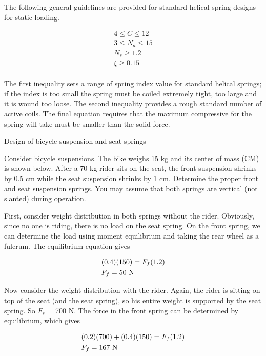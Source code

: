 \documentclass[a4paper,openany,12pt]{book}
\begin{document}
{{The following general guidelines are provided for standard helical
spring designs for static loading.

$$\begin{gathered}
    4 \leqslant C \leqslant 12 \\ 
    3 \leqslant N_a \leqslant 15 \\ 
    N_s \geqslant 1.2 \\ 
    \xi  \geqslant 0.15 \\ 
  \end{gathered}$$

The first inequality sets a range of spring index value for standard
helical springs; if the index is too small the spring must be coiled
extremely tight, too large and it is wound too loose. The second
inequality provides a rough standard number of active coils. The final
equation requires that the maximum compressive for the spring will take
must be smaller than the solid force.

Design of bicycle suspension and seat springs

Consider bicycle suspensions. The bike weighs 15 kg and its center of
mass (CM) is shown below. After a 70-kg rider sits on the seat, the
front suspension shrinks by 0.5 cm while the seat suspension shrinks by
1 cm. Determine the proper front and seat suspension springs. You may
assume that both springs are vertical (not slanted) during operation.

First, consider weight distribution in both springs without the rider.
Obviously, since no one is riding, there is no load on the seat spring.
On the front spring, we can determine the load using moment equilibrium
and taking the rear wheel as a fulcrum. The equilibrium equation gives

$$\begin{gathered}
      (0.4)(150) = F_f(1.2) \hfill \\
      F_f = 50 \text{ N} \hfill \\ 
    \end{gathered}$$

Now consider the weight distribution with the rider. Again, the rider is
sitting on top of the seat (and the seat spring), so his entire weight
is supported by the seat spring. So \(F_s\) = 700 N. The force in the
front spring can be determined by equilibrium, which gives

$$\begin{gathered}
      (0.2)(700) + (0.4)(150) = F_f(1.2) \hfill \\
      F_f = 167 \text{ N} \hfill \\ 
    \end{gathered}$$

}}
\end{document}
